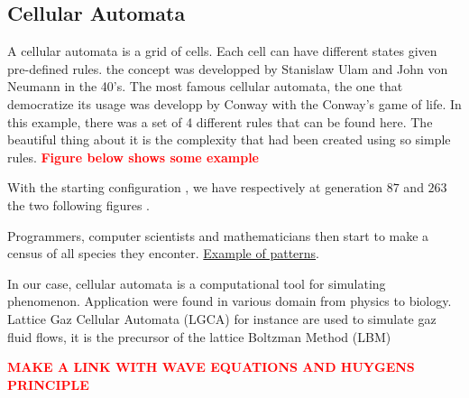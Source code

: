 \documentclass[../main.tex]{subfiles}
\begin{document}
\subsection{Cellular Automata}

A cellular automata is a grid of cells. Each cell can have different states given pre-defined rules. the concept was developped by Stanislaw Ulam and John von Neumann in the 40's.
The most famous cellular automata, the one that democratize its usage was developp by Conway with the Conway's game of life. In this example, there was a set of 4 different rules that can be found here.
The beautiful thing about it is the complexity that had been created using so simple rules. \textcolor{red}{\textbf{Figure below shows some example}}

With the starting configuration \figtonum, we have respectively at generation $87$ and $263$ the two following figures \figtonum.

Programmers, computer scientists and mathematicians then start to make a census of all species they enconter.
\href{https://en.wikipedia.org/wiki/Conway's_Game_of_Life#Examples_of_patterns}{Example of patterns}.

In our case, cellular automata is a computational tool for simulating phenomenon. Application were found in various domain from physics to biology. Lattice Gaz Cellular Automata (LGCA) for instance are used to simulate gaz fluid flows, it is the precursor of the lattice Boltzman Method (LBM)\cite{chen_1998}



\textcolor{red}{\textbf{MAKE A LINK WITH WAVE EQUATIONS AND HUYGENS PRINCIPLE}}
\end{document}
